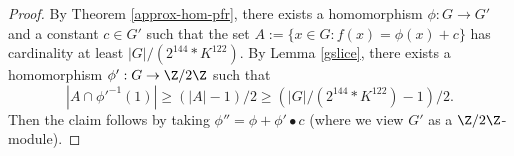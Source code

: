 \begin{proof}\leanok By Theorem \ref{approx-hom-pfr}, there exists a homomorphism $\phi: G \to G'$ and a constant $c \in G'$ such that the set $A := \{ x \in G: f(x) = \phi(x) + c\}$ has cardinality at least $|G| / (2 ^ {144} * K ^ {122})$.  By Lemma \ref{gslice}, there exists a homomorphism $\phi': G \to \Z/2\Z$ such that
$$ |A \cap \phi'^{-1}(1)| \geq (|A|-1)/2 \geq (|G| / (2 ^ {144} * K ^ {122}) - 1)/2.$$
Then the claim follows by taking $\phi'' = \phi + \phi' \bullet c$ (where we view $G'$ as a $\Z/2\Z$-module).
\end{proof}

